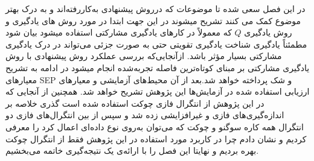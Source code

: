 در این فصل سعی شده تا موضوعات که درروش پیشنهادی به‌کاررفته‌اند و به درک بهتر موضوع کمک می کنند تشریح میشوند در این جهت ابتدا در مورد روش های یادگیری و روش یادگیری $Q$ که معمولاً در کارهای یادگیری مشارکتی استفاده  میشود بیان شود مطمئناً یادگیری شناخت یادگیری تقویتی حتی به ‌صورت جزئی می‌تواند در درک یادگیری مشارکتی بسیار مؤثر باشد.
ازآنجایی‌که بررسی عملکرد روش پیشنهادی با روش یادگیری مشارکتی بر مبنای کوتاه‌ترین فاصله تجربه‌شده انجام میشود در ادامه به تشریح معیارهای SEP و شک پرداخته خواهد شد.بعد از آن محیط‌های آزمایشی و معیارهای ارزیابی استفاده شده در آزمایش‌ها این پژوهش تشریح خواهد شد. همچنین از آنجایی که در این پژوهش از انتگرال‌ فازی چوکت استفاده شده است گذری خلاصه بر اندازه‌گیری‌های فازی و غیرافزایشی زده شد و سپس از بین انتگرال‌های فازی دو انتگرال همه کاره سوگنو و چوکت که می‌توان به‌روی نوع داده‌ای اعمال کرد را معرفی کردیم و نشان دادم چرا در کاربرد مورد استفاده در این پژوهش فقط از انتگرال چوکت بهره بردیم و نهایتا این فصل را با ارائه‌ی یک نتیجه‌گیری خاتمه می‌بخشیم.